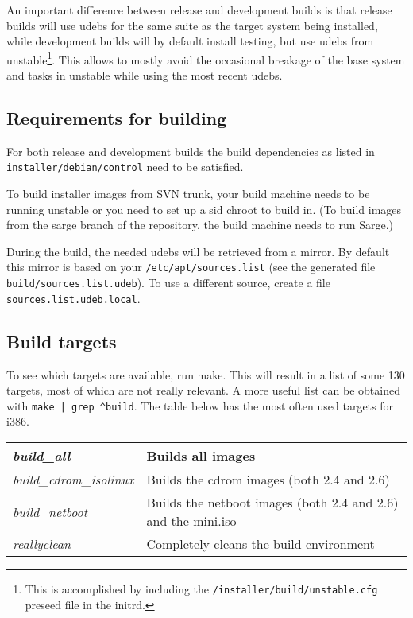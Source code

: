 \documentclass[a4paper,10pt]{article}
\begin{document}
An important difference between release and development builds is that release builds will use udebs for the same suite as the target system being installed, while development builds will by default install testing, but use udebs from unstable\footnote{This is accomplished by including the \texttt{/installer/build/unstable.cfg} preseed file in the initrd.}. This allows to mostly avoid the occasional breakage of the base system and tasks in unstable while using the most recent udebs. 


\subsection{Requirements for building}
For both release and development builds the build dependencies as listed in \texttt{installer/debian/control} need to be satisfied. 

To build installer images from SVN trunk, your build machine needs to be running unstable or you need to set up a sid chroot to build in. (To build images from the sarge branch of the repository, the build machine needs to run Sarge.)

During the build, the needed udebs will be retrieved from a mirror. By default this mirror is based on your \texttt{/etc/apt/sources.list} (see the generated file \texttt{build/sources.list.udeb}). To use a different source, create a file \texttt{sources.list.udeb.local}.


\subsection{Build targets}
To see which targets are available, run make. This will result in a list of some 130 targets, most of which are not really relevant. A more useful list can be obtained with \texttt{make | grep \^{ }build}. The table below has the most often used targets for i386.

\begin{tabular}{|l|l|}
\hline
\textit{build\_all} & Builds all images \\
\hline
\textit{build\_cdrom\_isolinux} & Builds the cdrom images (both 2.4 and 2.6) \\
\hline
\textit{build\_netboot} & Builds the netboot images (both 2.4 and 2.6) and the mini.iso \\
\hline
\textit{reallyclean} & Completely cleans the build environment \\
\hline
\end{tabular} 
\end{document}
